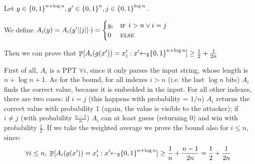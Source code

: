 \begin{enumerate}[(a)]
\begin{enumerate}[(i)]
		            \begin{solution}
			            Let $y \in {\{0, 1\}}^{n + \log{n}}, y' \in {\{0, 1\}}^n, j \in {\{0, 1\}}^{\log n}$.

			            We define $A_i(y) = A_i(y'||j||\cdot) = \begin{cases}
					            y_i & \textsc{if } i > n \vee i = j \\
					            0   & \textsc{else}
				            \end{cases}$

			            Then we can prove that $\mathop{\mathbb P}[A_i(g(x')) = x_i' : x' {\leftarrow_\$} {\{0, 1\}}^{n + \log{n}}] \ge \frac{1}{2} + \frac{1}{2n}$

			            First of all, $A_i$ is a PPT $\forall i$, since it only parses the input string, whose length is $n + \log{n} + 1$.
			            As for the bound, for all indexes $i > n$ (i.e. the last $\log{n}$ bits) $A_i$ finds the correct value, because it is embedded in the input.
			            For all other indexes, there are two cases: if $i = j$ (this happens with probability = $1/n$) $A_i$ returns the correct value with probability 1 (again, the value is visible to the attacker); if $i \ne j$ (with probability $\frac{n-1}{n}$) $A_i$ can at least guess (returning 0) and win with probability $\frac{1}{2}$. If we take the weighted average we prove the bound also for $i \le n$, since:
			            \[\forall i \le n,\; \mathop{\mathbb P}[A_i(g(x')) = x_i' : x' {\leftarrow_\$} {\{0, 1\}}^{n + \log{n}}] \ge \frac{1}{n} + \frac{n-1}{2n} = \frac{1}{2} + \frac{1}{2n} \]
		            \end{solution}
	      \end{enumerate}
\end{enumerate}